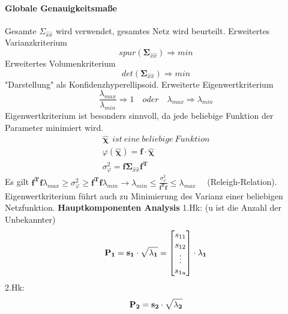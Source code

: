 \documentclass[12pt]{article}
\begin{document}
\paragraph{Globale Genauigkeitsmaße}
\noindent Gesamte $\Sigma_{\hat{x}\hat{x}}$ wird verwendet, gesamtes Netz wird beurteilt. \newline
Erweitertes Varianzkriterium
\begin{equation*}
spur(\bm{\Sigma}_{\hat{x}\hat{x}}) \Rightarrow min
\end{equation*}
Erweitertes Volumenkriterium
\begin{equation*}
det(\bm{\Sigma}_{\hat{x}\hat{x}}) \Rightarrow min
\end{equation*}
"Darstellung" als Konfidenzhyperellipsoid.\newline
Erweiterte Eigenwertkriterium
\begin{equation*}
\frac{\lambda_{max}}{\lambda_{min}} \Rightarrow 1 \quad oder \quad \lambda_{max} \Rightarrow \lambda_{min} 
\end{equation*}
Eigenwertkriterium ist besonders sinnvoll, da jede beliebige Funktion der Parameter minimiert wird.
\begin{gather*}
\bm{\hat{\chi}} \ \ ist \ eine\  beliebige \ Funktion \\
\varphi(\bm{\hat{\chi}}) = \bm{f} \cdot \bm{\hat{\chi}} \\
\sigma_{\varphi}^2 = \bm{f} \bm{\Sigma}_{\hat{x}\hat{x}} \bm{f^{T}}
\end{gather*}
Es gilt $\bm{f^T} \bm{f} \lambda_{max} \geq \sigma_{\varphi}^2 \geq \bm{f^T} \bm{f} \lambda_{min} \longrightarrow \lambda_{min} \leq \frac{\sigma_{\varphi}^2}{\bm{f^T} \bm{f}} \leq  \lambda_{max}\quad$ (Releigh-Relation). \newline
Eigenwertkriterium führt auch zu Minimierung des Varianz einer beliebigen Netzfunktion.\newline
\textbf{Hauptkomponenten Analysis} \newline
1.Hk: (u ist die Anzahl der Unbekannter)
\begin{equation*}
\bf{P_1} = \bf{s_1} \cdot \sqrt{\lambda_1} = \begin{bmatrix}
s_{11} \\
s_{12} \\ 
\vdots \\
s_{1u}
\end{bmatrix} \cdot \lambda_1
\end{equation*} 
2.Hk: 
\begin{equation*}
\bf{P_2} = \bf{s_2} \cdot \sqrt{\lambda_2}
\end{equation*}
\end{document}
